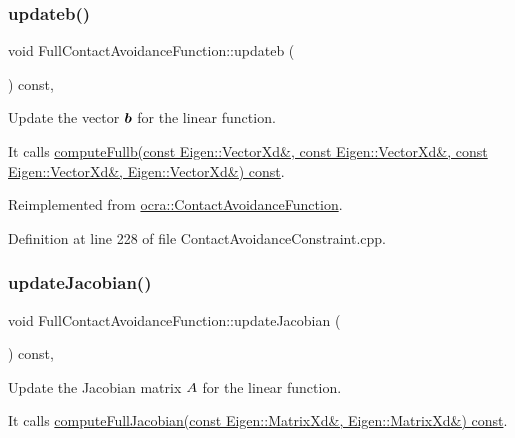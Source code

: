 \subsubsection{\texorpdfstring{updateb()}{updateb()}}
{\footnotesize\ttfamily void Full\+Contact\+Avoidance\+Function\+::updateb (\begin{DoxyParamCaption}{ }\end{DoxyParamCaption}) const\hspace{0.3cm}{\ttfamily [protected]}, {\ttfamily [virtual]}}

Update the vector $ \mbox{\boldmath${b}$} $ for the linear function.

It calls \hyperlink{classocra_1_1ContactAvoidanceFunction_a9afd02871f0d26321b526290f565d541}{compute\+Fullb(const Eigen\+::\+Vector\+Xd\&, const Eigen\+::\+Vector\+Xd\&, const Eigen\+::\+Vector\+Xd\&, Eigen\+::\+Vector\+Xd\&) const}. 

Reimplemented from \hyperlink{classocra_1_1ContactAvoidanceFunction_aed2f145f17ff9fd8dd646018376ea7e9}{ocra\+::\+Contact\+Avoidance\+Function}.



Definition at line 228 of file Contact\+Avoidance\+Constraint.\+cpp.

\hypertarget{classocra_1_1FullContactAvoidanceFunction_a91b21004faed7ffa6a51e975abc93797}{}\label{classocra_1_1FullContactAvoidanceFunction_a91b21004faed7ffa6a51e975abc93797} 
\subsubsection{\texorpdfstring{update\+Jacobian()}{updateJacobian()}}
{\footnotesize\ttfamily void Full\+Contact\+Avoidance\+Function\+::update\+Jacobian (\begin{DoxyParamCaption}{ }\end{DoxyParamCaption}) const\hspace{0.3cm}{\ttfamily [protected]}, {\ttfamily [virtual]}}

Update the Jacobian matrix $ A $ for the linear function.

It calls \hyperlink{classocra_1_1ContactAvoidanceFunction_a59994d2c3f364575ecff7fb23b7e10ab}{compute\+Full\+Jacobian(const Eigen\+::\+Matrix\+Xd\&, Eigen\+::\+Matrix\+Xd\&) const}. 

